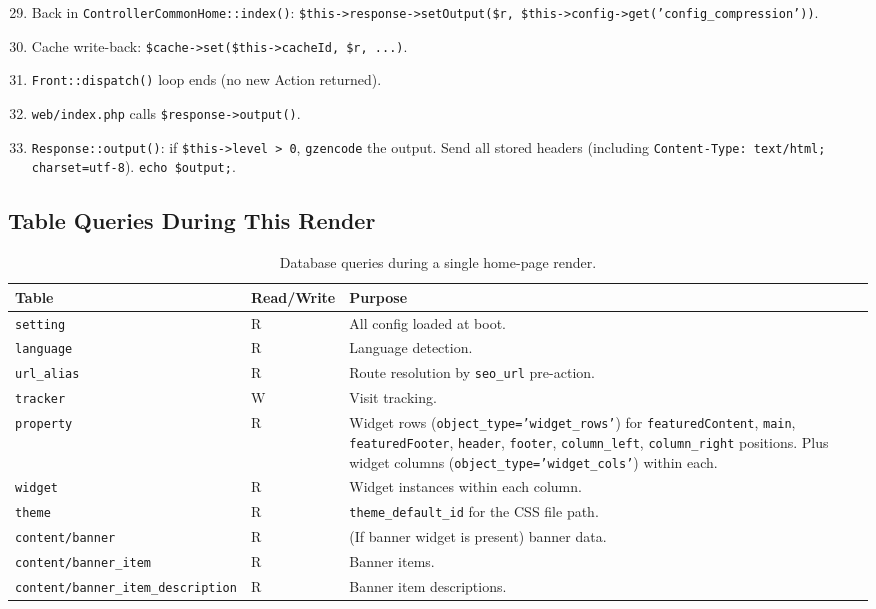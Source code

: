 \documentclass[11pt,a4paper]{article}
\begin{document}
\begin{enumerate}[leftmargin=1.6em,itemsep=2pt]
  \setcounter{enumi}{28}
  \item Back in \texttt{ControllerCommonHome::index()}:
        \texttt{\$this->response->setOutput(\$r,
        \$this->config->get('config\_compression'))}.
  \item Cache write-back:
        \texttt{\$cache->set(\$this->cacheId, \$r, ...)}.
  \item \texttt{Front::dispatch()} loop ends (no new Action
        returned).
  \item \texttt{web/index.php} calls \texttt{\$response->output()}.
  \item \texttt{Response::output()}: if \texttt{\$this->level > 0},
        \texttt{gzencode} the output. Send all stored headers
        (including \texttt{Content-Type: text/html; charset=utf-8}).
        \texttt{echo \$output;}.
\end{enumerate}

\subsection{Table Queries During This Render}

\begin{table}[htbp]
\centering
\caption{Database queries during a single home-page render.}\label{tab:render-queries}
\small
\begin{tabularx}{\columnwidth}{llX}
\toprule
\textbf{Table} & \textbf{Read/Write} & \textbf{Purpose} \\
\midrule
\texttt{setting}       & R & All config loaded at boot. \\
\texttt{language}      & R & Language detection. \\
\texttt{url\_alias}    & R & Route resolution by \texttt{seo\_url} pre-action. \\
\texttt{tracker}       & W & Visit tracking. \\
\texttt{property}      & R & Widget rows (\texttt{object\_type='widget\_rows'}) for \texttt{featuredContent}, \texttt{main}, \texttt{featuredFooter}, \texttt{header}, \texttt{footer}, \texttt{column\_left}, \texttt{column\_right} positions. Plus widget columns (\texttt{object\_type='widget\_cols'}) within each. \\
\texttt{widget}        & R & Widget instances within each column. \\
\texttt{theme}         & R & \texttt{theme\_default\_id} for the CSS file path. \\
\texttt{content/banner} & R & (If banner widget is present) banner data. \\
\texttt{content/banner\_item} & R & Banner items. \\
\texttt{content/banner\_item\_description} & R & Banner item descriptions. \\
\bottomrule
\end{tabularx}
\end{table}
\end{document}
